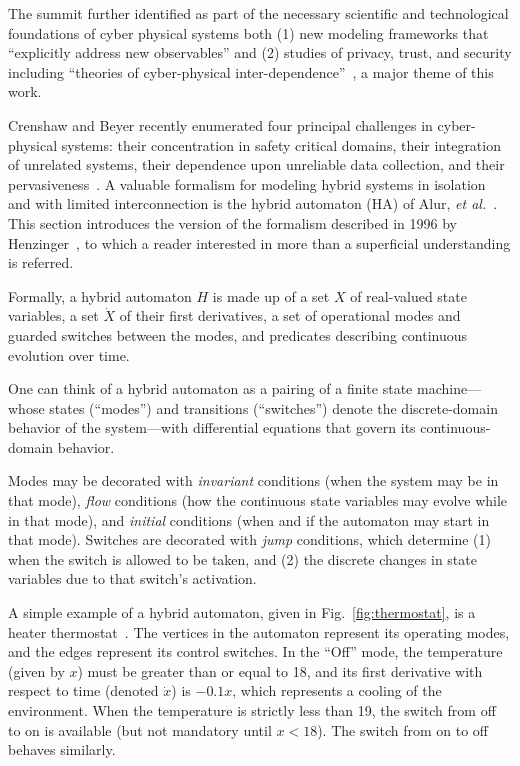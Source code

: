 The summit further identified as part of the necessary scientific and technological foundations of
cyber physical systems both (1) new modeling frameworks that ``explicitly address new observables'' and (2)
studies of privacy, trust, and security including ``theories of cyber-physical inter-dependence''~\cite{summitreport2008},
a major theme of this work.

Crenshaw and Beyer recently enumerated four principal challenges in 
cyber-physical systems:
their concentration in safety critical domains, their integration of 
unrelated systems, their dependence upon unreliable 
data collection, and their pervasiveness~\cite{crenshaw2010upbot}.
A valuable formalism for modeling hybrid systems in isolation and with limited 
interconnection is the hybrid automaton (HA) of Alur, \emph{et al.}~\cite{alur1993hybrid}. 
This section introduces the version of the formalism described in 1996 by 
Henzinger~\cite{henzinger1996theory}, to which a reader interested in more 
than a superficial understanding is referred. 

Formally,
a hybrid automaton $H$ is made up of a set $X$ of real-valued state variables, 
a set $\dot{X}$ of their first derivatives, a set of operational modes and 
guarded switches between the modes, and predicates describing continuous 
evolution over time.

One can think of a hybrid automaton as a pairing of a finite state 
machine---whose states (``modes'') and transitions (``switches'') denote the 
discrete-domain behavior of the system---with differential equations that
govern its continuous-domain behavior.

Modes may be decorated with \emph{invariant} conditions (when the 
system may be in that mode), \emph{flow} conditions (how the 
continuous state variables may evolve while in that mode), and \emph{initial}
conditions (when and if the automaton may start in that mode). 
Switches are decorated with 
\emph{jump} conditions, which determine
(1) when the switch is allowed to be taken, and (2) the discrete changes 
in state variables due to that
switch's activation.

A simple example of a hybrid automaton, given in Fig.~\ref{fig:thermostat}, 
is a
heater thermostat~\cite{henzinger1996theory}. The vertices in the automaton represent 
its operating modes, and the edges represent its control
switches. In the ``Off'' mode, the temperature (given by $x$) must be greater 
than or equal to 18, and
its first derivative with respect to time (denoted $\dot{x}$) is $-0.1x$, which 
represents a cooling of
the environment. When the temperature is strictly less than 19, the switch from
off to on is available (but
not mandatory until $x < 18$). The switch from on to off behaves similarly.

